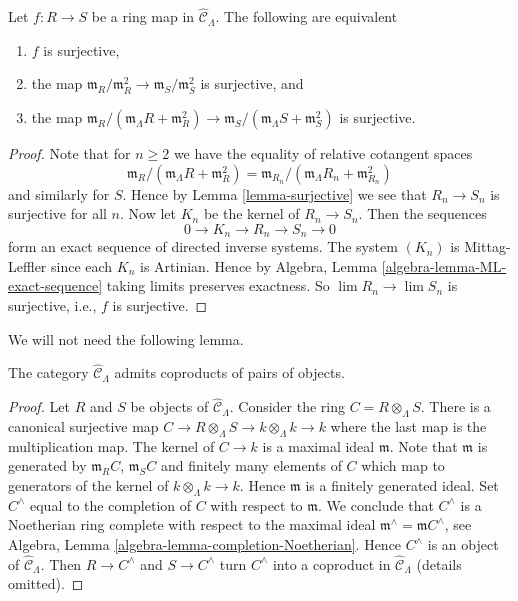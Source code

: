 \begin{lemma}
\label{lemma-surjective-cotangent-space}
Let $f: R \to S$ be a ring map in $\widehat{\mathcal{C}}_\Lambda$.
The following are equivalent
\begin{enumerate}
\item $f$ is surjective,
\item the map
$\mathfrak m_R/\mathfrak m_R^2 \to \mathfrak m_S/\mathfrak m_S^2$
is surjective, and
\item the map
$\mathfrak m_R/(\mathfrak m_\Lambda R + \mathfrak m_R^2) \to
\mathfrak m_S/(\mathfrak m_\Lambda S + \mathfrak m_S^2)$
is surjective.
\end{enumerate}
\end{lemma}

\begin{proof}
Note that for $n \geq 2$ we have the equality of relative cotangent spaces
$$
\mathfrak m_R/(\mathfrak m_\Lambda R + \mathfrak m_R^2)
=
\mathfrak m_{R_n}/(\mathfrak m_\Lambda R_n + \mathfrak m_{R_n}^2)
$$
and similarly for $S$. Hence by
Lemma \ref{lemma-surjective}
we see that $R_n \to S_n$ is surjective for all $n$.
Now let $K_n$ be the kernel of $R_n \to S_n$.  Then the sequences 
$$
0 \to K_n \to R_n \to S_n \to 0
$$
form an exact sequence of directed inverse systems. The system $(K_n)$ is 
Mittag-Leffler since each $K_n$ is Artinian. Hence by
Algebra, Lemma \ref{algebra-lemma-ML-exact-sequence}
taking limits preserves exactness. So
$\lim R_n \to \lim S_n$ is surjective, i.e., $f$ is surjective.
\end{proof}

\noindent
We will not need the following lemma.

\begin{lemma}
\label{lemma-CLambdahat-coproducts}
The category $\widehat{\mathcal{C}}_\Lambda$ admits coproducts
of pairs of objects.
\end{lemma}

\begin{proof}
Let $R$ and $S$ be objects of $\widehat{\mathcal{C}}_\Lambda$.
Consider the ring $C = R \otimes_\Lambda S$. There is a canonical
surjective map $C \to R \otimes_\Lambda S \to k \otimes_\Lambda k \to k$
where the last map is the multiplication map. The kernel of
$C \to k$ is a maximal ideal $\mathfrak m$. Note that $\mathfrak m$
is generated by $\mathfrak m_R C$, $\mathfrak m_S C$ and finitely many
elements of $C$ which map to generators of the kernel of
$k \otimes_\Lambda k \to k$. Hence $\mathfrak m$ is a finitely
generated ideal. Set
$C^\wedge$ equal to the completion of $C$ with respect to $\mathfrak m$.
We conclude that $C^\wedge$ is a Noetherian ring complete with respect to
the maximal ideal $\mathfrak m^\wedge = \mathfrak mC^\wedge$, see
Algebra, Lemma \ref{algebra-lemma-completion-Noetherian}.
Hence $C^\wedge$ is an object of $\widehat{\mathcal{C}}_\Lambda$.
Then $R \to C^\wedge$ and $S \to C^\wedge$ turn $C^\wedge$
into a coproduct in $\widehat{\mathcal{C}}_\Lambda$ (details omitted).
\end{proof}

